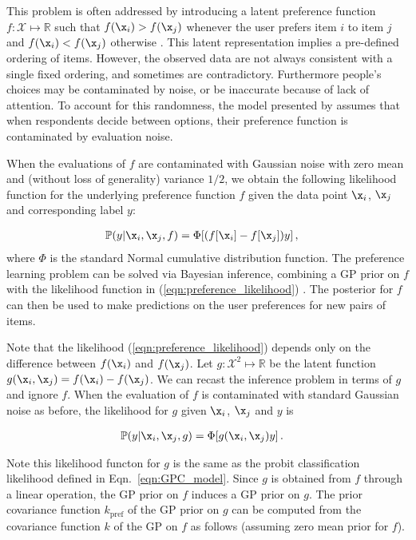 This problem is often addressed by introducing a latent preference function $f:\mathcal{X}\mapsto \mathbb{R}$ such that
$f(\x_i) > f(\x_j)$ whenever the user prefers item $i$ to item $j$ and $f(\x_i) < f(\x_j)$ otherwise \citep{Chu2005}. This latent representation implies a pre-defined ordering of items. However, the observed data are not always consistent with a single fixed ordering, and sometimes are contradictory. Furthermore people's choices may be contaminated by noise, or be inaccurate because of lack of attention. To account for this randomness, the model presented by \citet{Chu2005} assumes that when respondents decide between options, their preference function is contaminated by evaluation noise.

When the evaluations of $f$ are contaminated with Gaussian noise with zero mean and (without loss of generality) variance $1/2$, we obtain the following likelihood function for the underlying preference function $f$ given the data point $\x_i$, $\x_j$ and corresponding label $y$:

\begin{align}
\mathbb{P}(y|\x_i,\x_j,f) &= \Phi[(f[\x_i] - f[\x_j])y]\,,\label{eqn:preference_likelihood}
\end{align}
where $\Phi$ is the standard Normal cumulative distribution function. The preference learning problem can be solved via Bayesian inference, combining a GP prior on $f$ with the likelihood function in (\ref{eqn:preference_likelihood}) \citep{Chu2005}. The posterior for $f$ can then be used to make predictions on the user preferences for new pairs of items.

Note that the likelihood (\ref{eqn:preference_likelihood}) depends only on the difference between $f(\x_i)$ and $f(\x_j)$.
Let $g:\mathcal{X}^2\mapsto\mathbb{R}$ be the latent function $g(\x_i,\x_j) = f(\x_i) - f(\x_j)$.
We can recast the inference problem in terms of $g$ and ignore $f$. When the evaluation of $f$ is contaminated with standard Gaussian noise as before, the likelihood for $g$ given $\x_i$, $\x_j$ and $y$ is

\begin{align}
\mathbb{P}(y|\x_i,\x_j,g) &= \Phi[g(\x_i, \x_j)y]\,.\label{eqn:preference_likelihood2}
\end{align}

Note this likelihood functon for $g$ is the same as the probit classification likelihood defined in Eqn.\ \eqref{eqn:GPC_model}. Since $g$ is obtained from $f$ through a linear operation, the GP prior on $f$ induces a GP prior on $g$. The prior covariance function $k_\text{pref}$ of the GP prior on $g$ can be computed from the covariance function $k$ of the GP on $f$ as follows (assuming zero mean prior for $f$).

